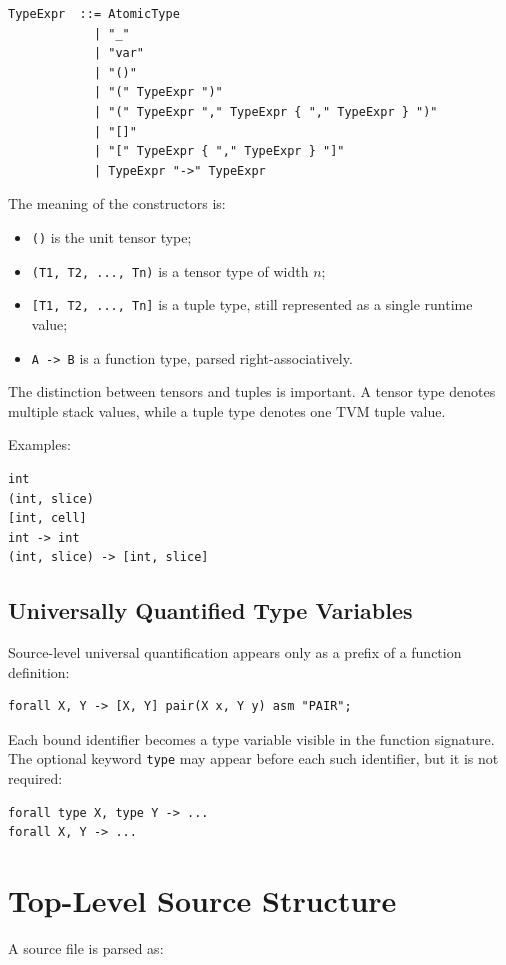 \documentclass[12pt,oneside]{article}
\begin{document}
\begin{verbatim}
TypeExpr  ::= AtomicType
            | "_"
            | "var"
            | "()"
            | "(" TypeExpr ")"
            | "(" TypeExpr "," TypeExpr { "," TypeExpr } ")"
            | "[]"
            | "[" TypeExpr { "," TypeExpr } "]"
            | TypeExpr "->" TypeExpr
\end{verbatim}

The meaning of the constructors is:

\begin{itemize}
\item \verb|()| is the unit tensor type;
\item \verb|(T1, T2, ..., Tn)| is a tensor type of width \(n\);
\item \verb|[T1, T2, ..., Tn]| is a tuple type, still represented as a single
runtime value;
\item \verb|A -> B| is a function type, parsed right-associatively.
\end{itemize}

The distinction between tensors and tuples is important. A tensor type denotes
multiple stack values, while a tuple type denotes one TVM tuple value.

Examples:

\begin{verbatim}
int
(int, slice)
[int, cell]
int -> int
(int, slice) -> [int, slice]
\end{verbatim}

\subsection{Universally Quantified Type Variables}
\label{sec:types-forall}
Source-level universal quantification appears only as a prefix of a function
definition:

\begin{verbatim}
forall X, Y -> [X, Y] pair(X x, Y y) asm "PAIR";
\end{verbatim}

Each bound identifier becomes a type variable visible in the function
signature. The optional keyword \verb|type| may appear before each such
identifier, but it is not required:

\begin{verbatim}
forall type X, type Y -> ...
forall X, Y -> ...
\end{verbatim}

\section{Top-Level Source Structure}
\label{sec:toplevel}
A source file is parsed as:
\end{document}
